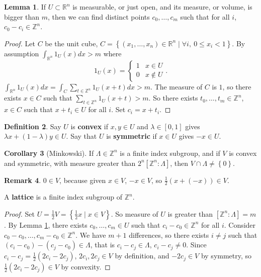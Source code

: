\documentclass{article}
\newcommand{\Z}{\mathbb{Z}}
\newcommand{\R}{\mathbb{R}}
\newcommand{\rb}[1]{\left( #1 \right)}
\renewcommand{\sb}[1]{\left[ #1 \right]}
\newcommand{\cb}[1]{\left\{ #1 \right\}}
\theoremstyle{definition}\newtheorem{definition}{Definition}[section]
\theoremstyle{definition}\newtheorem{remark}[definition]{Remark}
\theoremstyle{definition}\newtheorem*{example}{Example}
\theoremstyle{definition}\newtheorem*{note}{Note}
\newtheorem{lemma}[definition]{Lemma}
\newtheorem{corollary}[definition]{Corollary}
\begin{document}
\begin{lemma}
\label{lem:4.1}
If $ U \subset \R^n $ is measurable, or just open, and its measure, or volume, is bigger than $ m $, then we can find distinct points $ c_0, \dots, c_m $ such that for all $ i $, $ c_0 - c_i \in \Z^n $.
\end{lemma}

\begin{proof}
Let $ C $ be the unit cube, $ C = \cb{\rb{x_1, \dots, x_n} \in \R^n \mid \forall i, \ 0 \le x_i < 1} $. By assumption $ \int_{\R^n} 1_U\rb{x} dx > m $ where
$$ 1_U\rb{x} = \begin{cases} 1 & x \in U \\ 0 & x \notin U \end{cases}. $$
$ \int_{\R^n} 1_U\rb{x} dx = \int_C \sum_{t \in \Z^n} 1_U\rb{x + t}dx > m $. The measure of $ C $ is $ 1 $, so there exists $ x \in C $ such that $ \sum_{t \in \Z^n} 1_U\rb{x + t} > m $. So there exists $ t_0, \dots, t_m \in \Z^n $, $ x \in C $ such that $ x + t_i \in U $ for all $ i $. Set $ c_i = x + t_i $.
\end{proof}

\begin{definition}
Say $ U $ is \textbf{convex} if $ x, y \in U $ and $ \lambda \in \sb{0, 1} $ gives $ \lambda x + \rb{1 - \lambda}y \in U $. Say that $ U $ is \textbf{symmetric} if $ x \in U $ gives $ -x \in U $.
\end{definition}

\begin{corollary}[Minkowski]
\label{cor:4.3}
If $ \Lambda \in \Z^n $ is a finite index subgroup, and if $ V $ is convex and symmetric, with measure greater than $ 2^n\sb{\Z^n : \Lambda} $, then $ V \cap \Lambda \ne \cb{0} $.
\end{corollary}

\begin{remark}
$ 0 \in V $, because given $ x \in V $, $ -x \in V $, so $ \tfrac{1}{2}\rb{x + \rb{-x}} \in V $.
\end{remark}

A \textbf{lattice} is a finite index subgroup of $ \Z^n $.

\begin{proof}
Set $ U = \tfrac{1}{2}V = \cb{\tfrac{1}{2}x \mid x \in V} $. So measure of $ U $ is greater than $ \sb{\Z^n : \Lambda} = m $. By Lemma \ref{lem:4.1}, there exists $ c_0, \dots, c_m \in U $ such that $ c_i - c_0 \in \Z^n $ for all $ i $. Consider $ c_0 - c_0, \dots, c_m - c_0 \in \Z^n $. We have $ m + 1 $ differences, so there exists $ i \ne j $ such that $ \rb{c_i - c_0} - \rb{c_j - c_0} \in \Lambda $, that is $ c_i - c_j \in \Lambda $, $ c_i - c_j \ne 0 $. Since $ c_i - c_j = \tfrac{1}{2}\rb{2c_i - 2c_j} $, $ 2c_i, 2c_j \in V $ by definition, and $ -2c_j \in V $ by symmetry, so $ \tfrac{1}{2}\rb{2c_i - 2c_j} \in V $ by convexity.
\end{proof}
\end{document}

